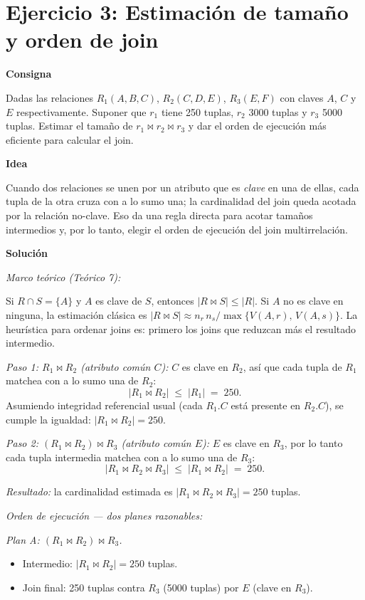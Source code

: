 \documentclass[11pt,a4paper]{article}
\newcommand{\jn}{\bowtie}
\newcommand{\itemcabecera}[1]{\noindent\textbf{#1}\par\medskip}
\newcommand{\bloqueConsigna}{\itemcabecera{Consigna}}
\newcommand{\bloqueIdea}{\itemcabecera{Idea}}
\newcommand{\bloqueSolucion}{\itemcabecera{Soluci\'on}}
\begin{document}
\section{Ejercicio 3: Estimación de tamaño y orden de join}

\bloqueConsigna

Dadas las relaciones $R_1(A,B,C)$, $R_2(C,D,E)$, $R_3(E,F)$ con claves $A$, $C$ y $E$ respectivamente. Suponer que $r_1$ tiene 250 tuplas, $r_2$ 3000 tuplas y $r_3$ 5000 tuplas. Estimar el tamaño de $r_1 \jn r_2 \jn r_3$ y dar el orden de ejecución más eficiente para calcular el join.

\bloqueIdea

Cuando dos relaciones se unen por un atributo que es \emph{clave} en una de ellas, cada tupla de la otra cruza con a lo sumo una; la cardinalidad del join queda acotada por la relación no-clave. Eso da una regla directa para acotar tamaños intermedios y, por lo tanto, elegir el orden de ejecución del join multirrelación.

\bloqueSolucion

\textit{Marco teórico (Teórico 7):}

Si $R \cap S = \{A\}$ y $A$ es clave de $S$, entonces $|R \jn S| \le |R|$. Si $A$ no es clave en ninguna, la estimación clásica es $|R \jn S| \approx n_r\, n_s / \max\{V(A,r),\,V(A,s)\}$. La heurística para ordenar joins es: primero los joins que reduzcan más el resultado intermedio.

\textit{Paso 1: $R_1 \jn R_2$ (atributo común $C$):} $C$ es clave en $R_2$, así que cada tupla de $R_1$ matchea con a lo sumo una de $R_2$:
\[
|R_1 \jn R_2| \;\le\; |R_1| \;=\; 250.
\]
Asumiendo integridad referencial usual (cada $R_1.C$ está presente en $R_2.C$), se cumple la igualdad: $|R_1 \jn R_2| = 250$.

\textit{Paso 2: $(R_1 \jn R_2) \jn R_3$ (atributo común $E$):} $E$ es clave en $R_3$, por lo tanto cada tupla intermedia matchea con a lo sumo una de $R_3$:
\[
|R_1 \jn R_2 \jn R_3| \;\le\; |R_1 \jn R_2| \;=\; 250.
\]

\textit{Resultado:} la cardinalidad estimada es $\boxed{|R_1 \jn R_2 \jn R_3| = 250}$ tuplas.

\textit{Orden de ejecución --- dos planes razonables:}

\textit{Plan A: $(R_1 \jn R_2) \jn R_3$.}
\begin{itemize}
    \item Intermedio: $|R_1 \jn R_2| = 250$ tuplas.
    \item Join final: 250 tuplas contra $R_3$ (5000 tuplas) por $E$ (clave en $R_3$).
\end{itemize}
\end{document}
